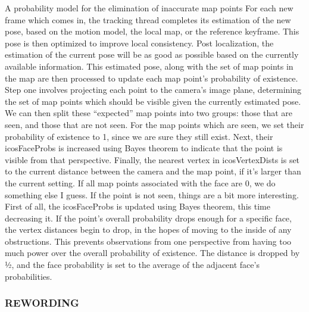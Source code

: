 \documentclass[12pt]{article}
\begin{document}
A probability model for the elimination of inaccurate map points
For each new frame which comes in, the tracking thread completes its estimation of the new pose, based on the motion model, the local map, or the reference keyframe. This pose is then optimized to improve local consistency. Post localization, the estimation of the current pose will be as good as possible based on the currently available information. This estimated pose, along with the set of map points in the map are then processed to update each map point’s probability of existence. Step one involves projecting each point to the camera’s image plane, determining the set of map points which should be visible given the currently estimated pose. We can then split these “expected” map points into two groups: those that are seen, and those that are not seen. For the map points which are seen, we set their probability of existence to 1, since we are sure they still exist. Next, their icosFaceProbs is increased using Bayes theorem to indicate that the point is visible from that perspective. Finally, the nearest vertex in icosVertexDists is set to the current distance between the camera and the map point, if it’s larger than the current setting. If all map points associated with the face are 0, we do something else I guess. If the point is not seen, things are a bit more interesting. First of all, the icosFaceProbs is updated using Bayes theorem, this time decreasing it. If the point’s overall probability drops enough for a specific face, the vertex distances begin to drop, in the hopes of moving to the inside of any obstructions. This prevents observations from one perspective from having too much power over the overall probability of existence. The distance is dropped by ½, and the face probability is set to the average of the adjacent face’s probabilities.

\subsubsection{REWORDING}
\end{document}
